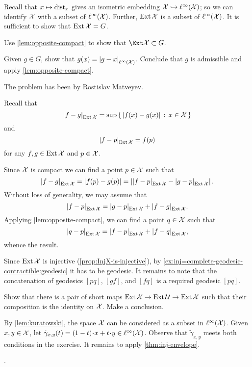 Recall that $x\mapsto \mathrm{dist}_x$ gives an isometric embedding $\spc{X}\z\hookrightarrow\ell^\infty(\spc{X})$;
so we can identify $\mathcal{X}$ with a subset of $\ell^\infty(\mathcal{X})$.
Further, $\mathop{\rm Ext}\nolimits\mathcal{X}$ is a subset of $\ell^\infty(\mathcal{X})$.
It is sufficient to show that $\mathop{\rm Ext}\nolimits\mathcal{X}=G$.

Use \ref{lem:opposite-compact} to show that $\Ext\spc{X}\subset G$.

Given $g\in G$, show that $g(x)=\dist{g}{x}{\ell^\infty(\spc{X})}$.
Conclude that $g$ is admissible and apply \ref{lem:opposite-compact}.

 The problem has been by Rostislav Matveyev.

Recall that 
\[\dist{f}{g}{\Inj\spc{X}}=\sup\set{|f(x)-g(x)|}{x\in\spc{X}}\]
and 
\[\dist{f}{p}{\Inj\spc{X}}=f(p)\]
for any $f,g\in \mathop{\rm Ext}\nolimits\mathcal{X}$ and $p\in \mathcal{X}$.

Since $\mathcal{X}$ is compact we can find a point $p\in\mathcal{X}$ such that 
\[\dist{f}{g}{\Inj\spc{X}}=|f(p)-g(p)|=\left|\dist{f}{p}{\Inj\spc{X}}-\dist{g}{p}{\Inj\spc{X}}\right|.\]
Without loss of generality, we may assume that 
\[\dist{f}{p}{\Inj\spc{X}}
=
\dist{g}{p}{\Inj\spc{X}}
+
\dist{f}{g}{\Inj\spc{X}}.\]
Applying \ref{lem:opposite-compact}, we can find a point $q\in\mathcal{X}$ such that 
\[\dist{q}{p}{\Inj\spc{X}}
=
\dist{f}{p}{\Inj\spc{X}}
+
\dist{f}{q}{\Inj\spc{X}},\]
whence the result.

Since $\mathop{\rm Ext}\nolimits\mathcal{X}$ is injective (\ref{prop:InjX-is-injective}), by \ref{ex:inj=complete-geodesic-contractible:geodesic} it has to be geodesic. It remains to note that the concatenation of geodesics $[pq]$, $[gf]$, and $[fq]$ is a required geodesic $[pq]$.

Show that there is a pair of short maps 
$\mathop{\rm Ext}\nolimits\mathcal{X}\to\mathop{\rm Ext}\nolimits\mathcal{U}\to\mathop{\rm Ext}\nolimits\mathcal{X}$ 
such that their composition is the identity on $\mathcal{X}$.
Make a conclusion.

By \ref{lem:kuratowski}, the space $\mathcal{X}$ can be considered as a subset in $\ell^\infty(\mathcal{X})$.
Given $x,y\in \mathcal{X}$, let $\tilde\gamma_{x,y}(t)=(1-t)\cdot x+t\cdot y\in \ell^\infty(\spc{X})$.
Observe that $\tilde\gamma_{x,y}$ meets both conditions in the exercise.
It remains to apply \ref{thm:inj-envelope}.

 \cite[3.6]{lang-2013}.
